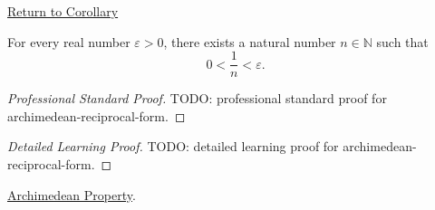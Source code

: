 \newpage
{}
\label{prf:archimedean-reciprocal-form}

\begin{remark*}[Return]
\hyperref[cor:archimedean-reciprocal-form]{Return to Corollary}
\end{remark*}

\begin{corollary*}
For every real number $\varepsilon>0$, there exists a natural number
$n\in\mathbb{N}$ such that
\[
0<\frac{1}{n}<\varepsilon.
\]
\end{corollary*}

\begin{proof}[Professional Standard Proof]
\LRAProofBodyStart
TODO: professional standard proof for archimedean-reciprocal-form.
\end{proof}

\begin{proof}[Detailed Learning Proof]
\LRAProofBodyStart
TODO: detailed learning proof for archimedean-reciprocal-form.
\end{proof}

\begin{remark*}
\end{remark*}

\begin{dependencies}
\hyperref[thm:archimedean-property]{Archimedean Property}.
\end{dependencies}

\clearpage
